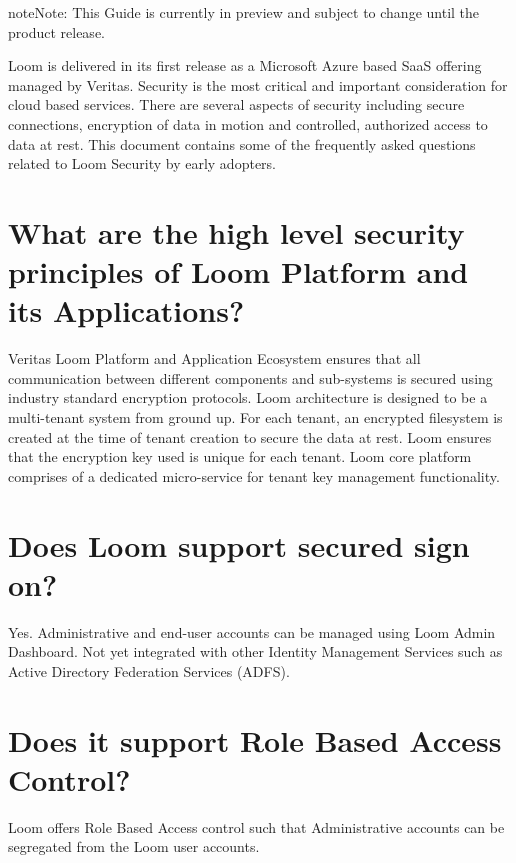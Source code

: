 \documentclass[letterpaper,10pt,english]{sphinxmanual}
\begin{document}
\begin{sphinxadmonition}{note}{Note:}
This Guide is currently in preview and subject to change until the product release.
\end{sphinxadmonition}

Loom is delivered in its first release as a Microsoft Azure based SaaS offering managed by Veritas. Security is the most critical and important consideration for cloud based services. There are several aspects of security including secure connections, encryption of data in motion and controlled, authorized access to data at rest. This document contains some of the frequently asked questions related to Loom Security by early adopters.


\section{What are the high level security principles of Loom Platform and its Applications?}
\label{\detokenize{loom_trbs_faq:what-are-the-high-level-security-principles-of-loom-platform-and-its-applications}}
Veritas Loom Platform and Application Ecosystem ensures that all communication between different components and sub-systems is secured using industry standard encryption protocols. Loom architecture is designed to be a multi-tenant system from ground up. For each tenant, an encrypted filesystem is created at the time of tenant creation to secure the data at rest. Loom ensures that the encryption key used is unique for each tenant. Loom core platform comprises of a dedicated micro-service for tenant key management functionality.


\section{Does Loom support secured sign on?}
\label{\detokenize{loom_trbs_faq:does-loom-support-secured-sign-on}}
Yes. Administrative and end-user accounts can be managed using Loom Admin Dashboard. Not yet integrated with other Identity Management Services such as Active Directory Federation Services (ADFS).


\section{Does it support Role Based Access Control?}
\label{\detokenize{loom_trbs_faq:does-it-support-role-based-access-control}}
Loom offers Role Based Access control such that Administrative accounts can be segregated from the Loom user accounts.
\end{document}
